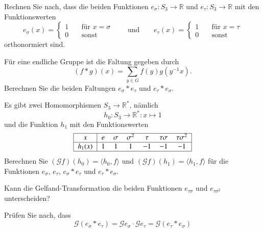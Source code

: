 \begin{teilaufgaben}
\item
Rechnen Sie nach, dass die beiden Funktionen $e_\sigma\colon S_3\to\mathbb{R}$
und $e_\tau\colon S_3\to\mathbb{R}$ mit den Funktionswerten
\[
e_\sigma(x)
=
\begin{cases}
1&\quad \text{für $x=\sigma$}\\
0&\quad \text{sonst}
\end{cases}
\qquad\text{und}\qquad
e_\tau(x)
=
\begin{cases}
1&\quad \text{für $x=\tau$}\\
0&\quad \text{sonst}
\end{cases}
\]
orthonormiert sind.
\item
Für eine endliche Gruppe ist die Faltung gegeben durch
\begin{equation}
(f*g)(x) = \sum_{y\in G} f(y)g(y^{-1}x).
\label{buch:gruppen:301:faltung}
\end{equation}
Berechnen Sie die beiden Faltungen $e_\sigma * e_\tau$ und
$e_\tau* e_\sigma$.
\item
Es gibt zwei Homomorphismen $S_3\to\mathbb{R}^*$, nämlich
\[
h_0\colon S_3 \to \mathbb{R}^* : x \mapsto 1
\]
und die Funktion $h_1$ mit den Funktionswerten
\[
\begin{tabular}{|>{$}c<{$}|>{$}c<{$}>{$}c<{$}>{$}c<{$}>{$}c<{$}>{$}c<{$}>{$}c<{$}|}
\hline
    x &e &\sigma &\sigma^2 &\tau &\tau\sigma &\tau\sigma^2 \\
\hline
h_1(x)&1 &1      &1        &-1   &-1         &-1 \\
\hline
\end{tabular}
\]
Berechnen Sie $(\mathscr{G}f)(h_0)=\langle h_0,f\rangle$
und $(\mathscr{G}f)(h_1)=\langle h_1,f\rangle$
für die Funktionen $e_\sigma$, $e_\tau$, $e_\sigma*e_\tau$
und $e_\tau*e_\sigma$.
\item
Kann die Gelfand-Transformation die beiden Funktionen
$e_{\tau\sigma}$ und $e_{\tau\sigma^2}$ unterscheiden?
\item
Prüfen Sie nach, dass
\[
\mathscr{G}(e_\sigma*e_\tau)
=
\mathscr{G}e_\sigma
\cdot
\mathscr{G}e_\tau
=
\mathscr{G}(e_\tau*e_\sigma)
\]
\end{teilaufgaben}

